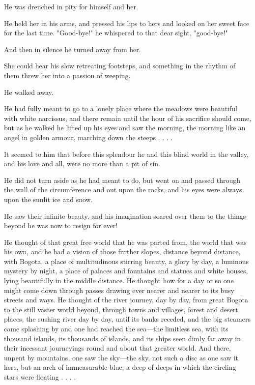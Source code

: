 \documentclass[submission]{sffms}
\begin{document}
He was drenched in pity for himself and her.

He held her in his arms, and pressed his lips to hers and looked on
her sweet face for the last time. "Good-bye!" he whispered to that
dear sight, "good-bye!"

And then in silence he turned away from her.

She could hear his slow retreating footsteps, and something in the
rhythm of them threw her into a passion of weeping.

He walked away.

He had fully meant to go to a lonely place where the meadows were
beautiful with white narcissus, and there remain until the hour of his
sacrifice should come, but as he walked he lifted up his eyes and saw
the morning, the morning like an angel in golden armour, marching down
the steeps . . . .

It seemed to him that before this splendour he and this blind world in
the valley, and his love and all, were no more than a pit of sin.

He did not turn aside as he had meant to do, but went on and passed
through the wall of the circumference and out upon the rocks, and his
eyes were always upon the sunlit ice and snow.

He saw their infinite beauty, and his imagination soared over them to
the things beyond he was now to resign for ever!

He thought of that great free world that he was parted from, the world
that was his own, and he had a vision of those further slopes,
distance beyond distance, with Bogota, a place of multitudinous
stirring beauty, a glory by day, a luminous mystery by night, a place
of palaces and fountains and statues and white houses, lying
beautifully in the middle distance. He thought how for a day or so one
might come down through passes drawing ever nearer and nearer to its
busy streets and ways. He thought of the river journey, day by day,
from great Bogota to the still vaster world beyond, through towns and
villages, forest and desert places, the rushing river day by day,
until its banks receded, and the big steamers came splashing by and
one had reached the sea---the limitless sea, with its thousand islands,
its thousands of islands, and its ships seen dimly far away in their
incessant journeyings round and about that greater world. And there,
unpent by mountains, one saw the sky---the sky, not such a disc as one
saw it here, but an arch of immeasurable blue, a deep of deeps in
which the circling stars were floating . . . .
\end{document}
